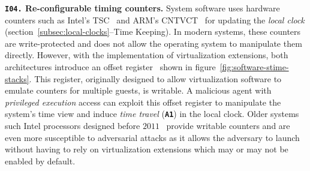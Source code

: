 \noindent\textbf{\texttt{I04.} Re-configurable timing counters.} 
System software uses hardware counters such as Intel's TSC~\cite{intel-tsc} and ARM's CNTVCT~\cite{arm-cntvct} for updating the \textit{local clock} (section~\ref{subsec:local-clocks}--Time Keeping). In modern systems, these counters are write-protected and does not allow the operating system to manipulate them directly. However, with the implementation of virtualization extensions, both architectures introduce an offset register~\cite{arm-cntvoff, intel-tsc-offset} shown in figure~\ref{fig:software-stime-stacks}. This register, originally designed to allow virtualization software to emulate counters for multiple guests, is writable. A malicious agent with \textit{privileged execution} access can exploit this offset register to manipulate the system's time view and induce \textit{time travel} (\textbf{\texttt{A1}}) in the local clock. Older systems such Intel processors designed before $2011$~\cite{intel-variant} provide writable counters and are even more susceptible to adversarial attacks as it allows the adversary to launch without having to rely on virtualization extensions which may or may not be enabled by default.